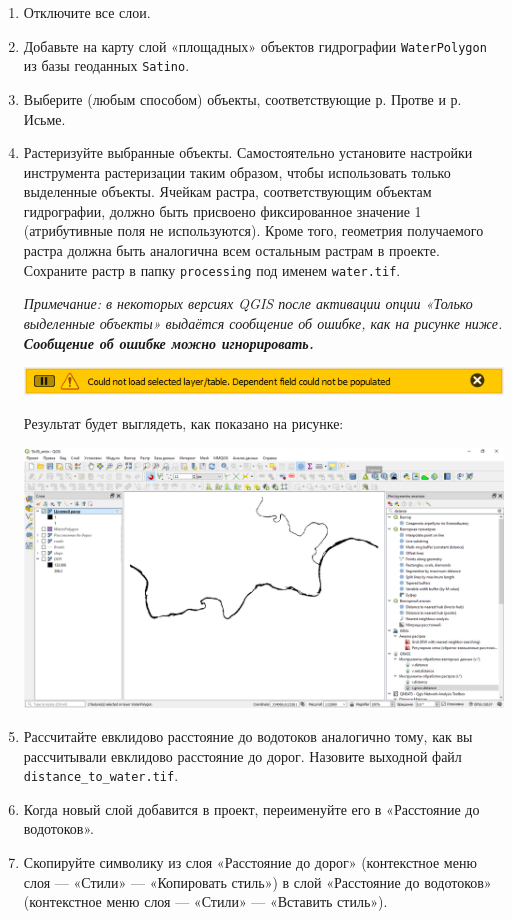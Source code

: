 \documentclass[
  12pt,
]{book}
\begin{document}
\begin{enumerate}
\def\labelenumi{\arabic{enumi}.}
\item
  Отключите все слои.
\item
  Добавьте на карту слой «площадных» объектов гидрографии \texttt{WaterPolygon} из базы геоданных \texttt{Satino}.
\item
  Выберите (любым способом) объекты, соответствующие р. Протве и р. Исьме.
\item
  Растеризуйте выбранные объекты. Самостоятельно установите настройки инструмента растеризации таким образом, чтобы использовать только выделенные объекты. Ячейкам растра, соответствующим объектам гидрографии, должно быть присвоено фиксированное значение 1 (атрибутивные поля не используются). Кроме того, геометрия получаемого растра должна быть аналогична всем остальным растрам в проекте. Сохраните растр в папку \texttt{processing} под именем \texttt{water.tif}.

  \emph{Примечание: в некоторых версиях QGIS после активации опции «Только выделенные объекты» выдаётся сообщение об ошибке, как на рисунке ниже. \textbf{Сообщение об ошибке можно игнорировать.}}

  \includegraphics{images/Ex12/rasterize_problem.png}

  Результат будет выглядеть, как показано на рисунке:

  \includegraphics{images/Ex12/water_raster.png}
\item
  Рассчитайте евклидово расстояние до водотоков аналогично тому, как вы рассчитывали евклидово расстояние до дорог. Назовите выходной файл \texttt{distance\_to\_water.tif}.
\item
  Когда новый слой добавится в проект, переименуйте его в «Расстояние до водотоков».
\item
  Скопируйте символику из слоя «Расстояние до дорог» (контекстное меню слоя --- «Стили» --- «Копировать стиль») в слой «Расстояние до водотоков» (контекстное меню слоя --- «Стили» --- «Вставить стиль»).
\end{enumerate}
\end{document}
